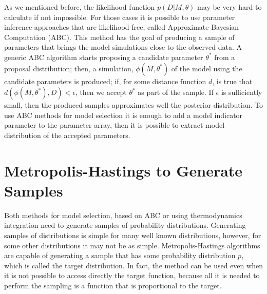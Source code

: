 As we mentioned before, the likelihood function 
$p(D | M, \theta)$ may be very hard to calculate if not 
impossible. For those cases it is possible to use parameter inference
approaches that are likelihood-free, called Approximate Bayesian 
Computation (ABC). This method has the goal of producing a sample of 
parameters that brings the model simulations close to the observed data.
A generic ABC algorithm starts proposing a candidate parameter 
$\theta^*$ from a proposal distribution; then, a simulation, 
$\phi (M, \theta^*)$ of the model using the candidate parameters is 
produced; if, for some distance function $d$, is true that 
$d(\phi(M, \theta^*), D) < \epsilon$, then we accept $\theta^*$ as part
of the sample. If $\epsilon$ is sufficiently small, then the produced
samples approximates well the posterior distribution. To use ABC methods
for model selection it is enough to add a model indicator parameter to 
the parameter array, then it is possible to extract model distribution
of the accepted parameters.

\section{Metropolis-Hastings to Generate Samples}
Both methods for model selection, based on ABC or using thermodynamics
integration need to generate samples of probability distributions. 
Generating samples of distributions is simple for many well known 
distributions, however, for some other distributions it may not be as
simple. Metropolis-Hastings algorithms are capable of generating a 
sample that has some probability distribution $p$, which is called the 
target distribution. In fact, the method can be used even when it is not
possible to access directly the target function, because all it is 
needed to perform the sampling is a function that is proportional to the
target.

